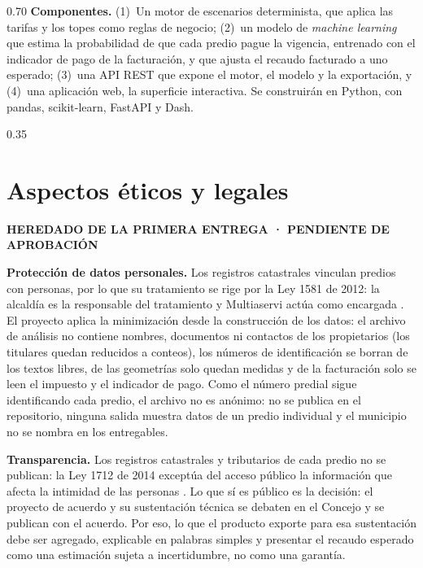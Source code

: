 \documentclass[12pt,letterpaper]{article}
\newcommand{\heredado}{\par\noindent\colorbox{amarillo}{\footnotesize\bfseries
  HEREDADO DE LA PRIMERA ENTREGA · PENDIENTE DE APROBACIÓN}\par\smallskip}
\begin{document}
\begin{espacio}{0.70}
\textbf{Componentes.} (1)~Un motor de escenarios determinista, que aplica las tarifas y
los topes como reglas de negocio; (2)~un modelo de \textit{machine learning} que estima
la probabilidad de que cada predio pague la vigencia, entrenado con el indicador de pago
de la facturación, y que ajusta el recaudo facturado a uno esperado; (3)~una API REST
que expone el motor, el modelo y la exportación, y (4)~una aplicación web, la superficie
interactiva. Se construirán en Python, con pandas, scikit-learn, FastAPI y Dash.

\end{espacio}

\begin{espacio}{0.35}
\section{Aspectos éticos y legales} %
\heredado

\textbf{Protección de datos personales.} Los registros catastrales vinculan predios con personas, por lo que su tratamiento se rige por
la Ley 1581 de 2012: la alcaldía es la responsable del tratamiento y Multiaservi actúa como
encargada \cite{ley1581_2012}. El proyecto aplica la minimización desde la construcción de los
datos: el archivo de análisis no contiene nombres, documentos ni contactos de los propietarios
(los titulares quedan reducidos a conteos), los números de identificación se borran de los
textos libres, de las geometrías solo quedan medidas y de la facturación solo se leen el
impuesto y el indicador de pago. Como el número predial sigue identificando cada predio, el
archivo no es anónimo: no se publica en el repositorio, ninguna salida muestra datos de un
predio individual y el municipio no se nombra en los entregables.

\textbf{Transparencia.} Los registros catastrales y tributarios de cada predio no se publican: la Ley 1712 de 2014
exceptúa del acceso público la información que afecta la intimidad de las personas
\cite{ley1712_2014}. Lo que sí es público es la decisión: el proyecto de acuerdo y su
sustentación técnica se debaten en el Concejo y se publican con el acuerdo. Por eso, lo que
el producto exporte para esa sustentación debe ser agregado, explicable en palabras simples y
presentar el recaudo esperado como una estimación sujeta a incertidumbre, no como una
garantía.


\end{espacio}
\end{document}
